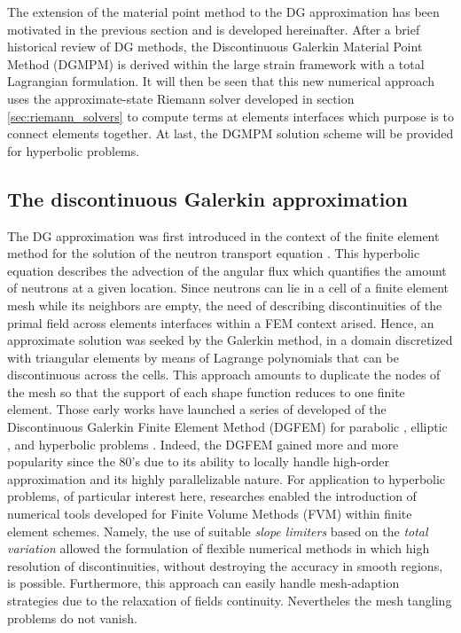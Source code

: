 The extension of the material point method to the DG approximation has been motivated in the previous section and is developed hereinafter. After a brief historical review of DG methods, the Discontinuous Galerkin Material Point Method (DGMPM) is derived within the large strain framework with a total Lagrangian formulation. It will then be seen that this new numerical approach uses the approximate-state Riemann solver developed in section \ref{sec:riemann_solvers} to compute terms at elements interfaces which purpose is to connect elements together. At last, the DGMPM solution scheme will be provided for hyperbolic problems.

\subsection{The discontinuous Galerkin approximation}
The DG approximation was first introduced in the context of the finite element method for the solution of the neutron transport equation \cite{NeutronDG}. This hyperbolic equation describes the advection of the angular flux which quantifies the amount of neutrons at a given location. Since neutrons can lie in a cell of a finite element mesh while its neighbors are empty, the need of describing discontinuities of the primal field across elements interfaces within a FEM context arised. Hence, an approximate solution was seeked by the Galerkin method, in a domain discretized with triangular elements by means of Lagrange polynomials that can be discontinuous across the cells. This approach amounts to duplicate the nodes of the mesh so that the support of each shape function reduces to one finite element. Those early works have launched a series of developed of the Discontinuous Galerkin Finite Element Method (DGFEM) for parabolic \cite{Arnold_IPM}, elliptic \cite{Hansbo_DGsolid,Noel_HEDG}, and hyperbolic problems \cite{Cockburn}. Indeed, the DGFEM gained more and more popularity since the 80's due to its ability to locally handle high-order approximation and its highly parallelizable nature. 
For application to hyperbolic problems, of particular interest here, researches enabled the introduction of numerical tools developed for Finite Volume Methods (FVM) within finite element schemes. Namely, the use of suitable \textit{slope limiters} \cite{vanLeer_Limiters} based on the \textit{total variation} \cite{Harten_TVD} allowed the formulation of flexible numerical methods in which high resolution of discontinuities, without destroying the accuracy in smooth regions, is possible. Furthermore, this approach can easily handle mesh-adaption strategies due to the relaxation of fields continuity. Nevertheles the mesh tangling problems do not vanish.

